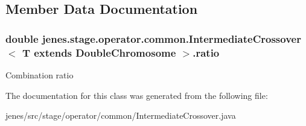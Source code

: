 \subsection{Member Data Documentation}
\hypertarget{classjenes_1_1stage_1_1operator_1_1common_1_1_intermediate_crossover_3_01_t_01extends_01_double_chromosome_01_4_a00aeef350858cb4ee81f06f7cf7a4c06}{
\subsubsection[{ratio}]{\setlength{\rightskip}{0pt plus 5cm}double jenes.\-stage.\-operator.\-common.\-Intermediate\-Crossover$<$ T extends {\bf Double\-Chromosome} $>$.ratio\hspace{0.3cm}{\ttfamily [protected]}}}\label{classjenes_1_1stage_1_1operator_1_1common_1_1_intermediate_crossover_3_01_t_01extends_01_double_chromosome_01_4_a00aeef350858cb4ee81f06f7cf7a4c06}
Combination ratio 

The documentation for this class was generated from the following file\-:\begin{DoxyCompactItemize}
\item 
jenes/src/stage/operator/common/Intermediate\-Crossover.\-java\end{DoxyCompactItemize}
